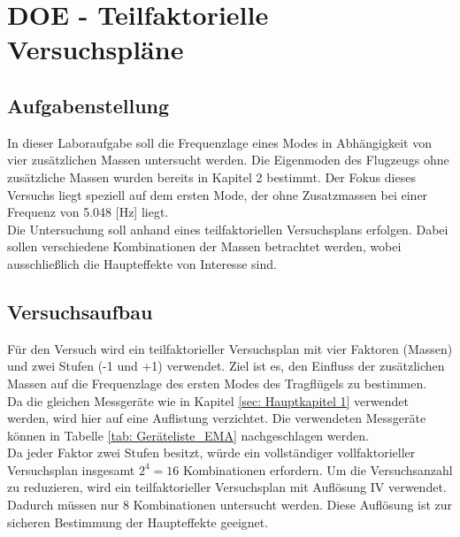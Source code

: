 \chapter{DOE - Teilfaktorielle Versuchspläne}
\label{sec: Hauptkapitel 4}

\section{Aufgabenstellung}
    In dieser Laboraufgabe soll die Frequenzlage eines Modes in Abhängigkeit von vier 
    zusätzlichen Massen untersucht werden. Die Eigenmoden des Flugzeugs ohne zusätzliche Massen 
    wurden bereits in Kapitel 2 bestimmt. Der Fokus dieses Versuchs liegt speziell auf dem 
    ersten Mode, der ohne Zusatzmassen  bei einer Frequenz von 5.048 [Hz] liegt.  
    \\

    \noindent
    Die Untersuchung soll anhand eines teilfaktoriellen Versuchsplans erfolgen.
    Dabei sollen verschiedene Kombinationen der Massen betrachtet werden, wobei 
    ausschließlich die Haupteffekte von Interesse sind.

\section{Versuchsaufbau}
    Für den Versuch wird ein teilfaktorieller Versuchsplan mit vier Faktoren (Massen) 
    und zwei Stufen (-1 und +1) verwendet. Ziel ist es, den Einfluss der zusätzlichen Massen 
    auf die Frequenzlage des ersten Modes des Tragflügels zu bestimmen.  
    \\

    \noindent
    Da die gleichen Messgeräte wie in Kapitel \ref{sec: Hauptkapitel 1}
    verwendet werden, wird hier auf eine Auflistung verzichtet. Die verwendeten
    Messgeräte können in Tabelle \ref{tab: Geräteliste_EMA} nachgeschlagen
    werden.
    \\

    \noindent
    Da jeder Faktor zwei Stufen besitzt, würde ein vollständiger vollfaktorieller
    Versuchsplan insgesamt $2^4 = 16$ Kombinationen erfordern. Um die
    Versuchsanzahl zu reduzieren, wird ein teilfaktorieller Versuchsplan mit
    Auflösung IV verwendet. Dadurch müssen nur 8 Kombinationen untersucht werden.
    Diese Auflösung ist zur sicheren Bestimmung der Haupteffekte geeignet.
    \\

